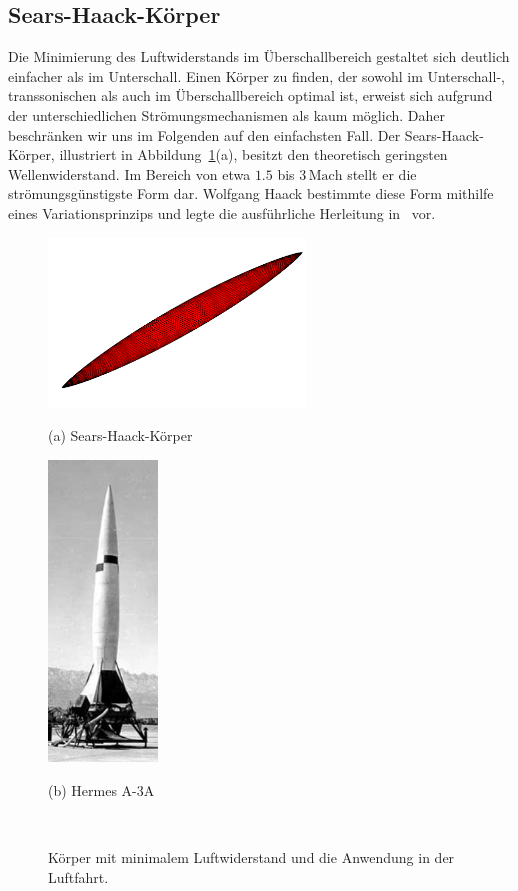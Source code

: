 \subsection{Sears-Haack-Körper}
Die Minimierung des Luftwiderstands im Überschallbereich 
gestaltet sich deutlich einfacher als im Unterschall. 
Einen Körper zu finden, der sowohl im Unterschall-, 
transsonischen als auch im Überschallbereich optimal ist, 
erweist sich aufgrund der unterschiedlichen 
Strömungsmechanismen als kaum möglich.
Daher beschränken wir uns im Folgenden auf den einfachsten Fall.
Der Sears-Haack-Körper, illustriert in Abbildung~\ref{fig:sears_haack}(a), 
%
besitzt den theoretisch geringsten Wellenwiderstand. 
Im Bereich von etwa $1.5$ bis $3\,\mathrm{Mach}$ 
stellt er die strömungsgünstigste Form dar. 
Wolfgang Haack bestimmte diese Form mithilfe eines 
%
Variationsprinzips und legte die ausführliche Herleitung 
in~\cite{Haack1941} vor.
\begin{figure}
    \centering
    \begin{minipage}[t]{0.48\textwidth}
       \centering
        \includegraphics[height=4.5cm]{papers/ueberschall/figures/Sears-Haack.png}
        \caption*{(a) Sears-Haack-Körper~\cite{SearsHaackWikipedia}}
    \end{minipage}
    \hfill
    \begin{minipage}[t]{0.48\textwidth}
        \centering
        \includegraphics[height=8cm]{papers/ueberschall/figures/hermes-a3a.jpg}
        \caption*{(b) Hermes A-3A~\cite{WeebauHermesA3A}}
    \end{minipage}
    \caption{Körper mit minimalem Luftwiderstand und die Anwendung in der Luftfahrt.}
    ~\label{fig:sears_haack}
\end{figure}
